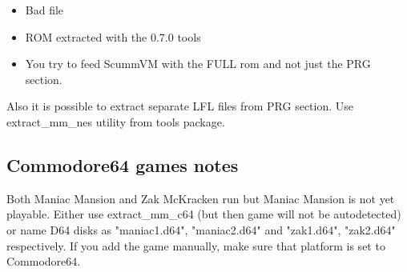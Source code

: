 \begin{itemize}
  \item Bad file
  \item ROM extracted with the 0.7.0 tools
  \item You try to feed ScummVM with the FULL rom and not just the PRG section.
\end{itemize}

Also it is possible to extract separate LFL files from PRG section. Use
extract\_mm\_nes utility from tools package.


\subsection{Commodore64 games notes}
Both Maniac Mansion and Zak McKracken run but Maniac Mansion is not yet
playable. Either use extract\_mm\_c64 (but then game will not be autodetected)
or name D64 disks as "maniac1.d64", "maniac2.d64" and "zak1.d64", "zak2.d64"
respectively. If you add the game manually, make sure that platform is set to
Commodore64.
